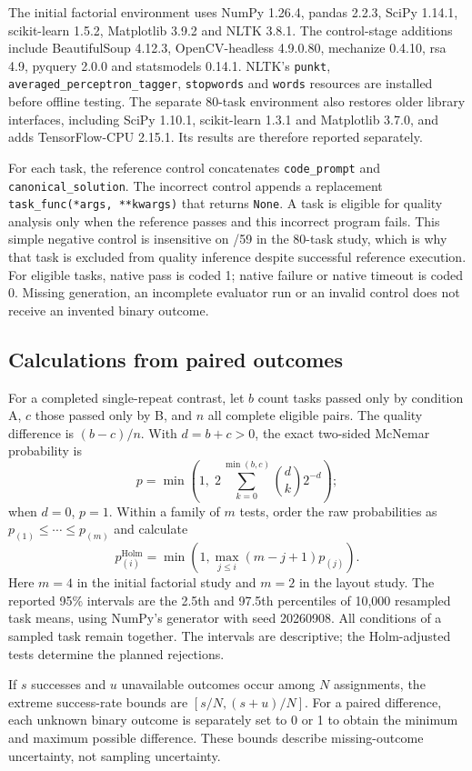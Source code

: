 The initial factorial environment uses NumPy 1.26.4, pandas 2.2.3, SciPy 1.14.1, scikit-learn 1.5.2, Matplotlib 3.9.2 and NLTK 3.8.1. The control-stage additions include BeautifulSoup 4.12.3, OpenCV-headless 4.9.0.80, mechanize 0.4.10, rsa 4.9, pyquery 2.0.0 and statsmodels 0.14.1. NLTK's \texttt{punkt}, \texttt{averaged\_perceptron\_tagger}, \texttt{stopwords} and \texttt{words} resources are installed before offline testing. The separate 80-task environment also restores older library interfaces, including SciPy 1.10.1, scikit-learn 1.3.1 and Matplotlib 3.7.0, and adds TensorFlow-CPU 2.15.1. Its results are therefore reported separately.

For each task, the reference control concatenates \texttt{code\_prompt} and \texttt{canonical\_solution}. The incorrect control appends a replacement \texttt{task\_func(*args, **kwargs)} that returns \texttt{None}. A task is eligible for quality analysis only when the reference passes and this incorrect program fails. This simple negative control is insensitive on /59 in the 80-task study, which is why that task is excluded from quality inference despite successful reference execution. For eligible tasks, native pass is coded 1; native failure or native timeout is coded 0. Missing generation, an incomplete evaluator run or an invalid control does not receive an invented binary outcome.

\subsection{Calculations from paired outcomes}
For a completed single-repeat contrast, let $b$ count tasks passed only by condition A, $c$ those passed only by B, and $n$ all complete eligible pairs. The quality difference is $(b-c)/n$. With $d=b+c>0$, the exact two-sided McNemar probability is
\[
p=\min\left(1,\;2\sum_{k=0}^{\min(b,c)}{d\choose k}2^{-d}\right);
\]
when $d=0$, $p=1$. Within a family of $m$ tests, order the raw probabilities as $p_{(1)}\le\cdots\le p_{(m)}$ and calculate
\[
p^{\mathrm{Holm}}_{(i)}
=\min\left(1,\max_{j\le i}(m-j+1)p_{(j)}\right).
\]
Here $m=4$ in the initial factorial study and $m=2$ in the layout study. The reported 95\% intervals are the 2.5th and 97.5th percentiles of 10,000 resampled task means, using NumPy's generator with seed 20260908. All conditions of a sampled task remain together. The intervals are descriptive; the Holm-adjusted tests determine the planned rejections.

If $s$ successes and $u$ unavailable outcomes occur among $N$ assignments, the extreme success-rate bounds are $[s/N,(s+u)/N]$. For a paired difference, each unknown binary outcome is separately set to 0 or 1 to obtain the minimum and maximum possible difference. These bounds describe missing-outcome uncertainty, not sampling uncertainty.


